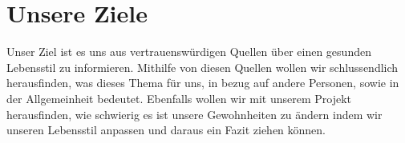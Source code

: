 \chapter{Unsere Ziele}

Unser Ziel ist es uns aus vertrauenswürdigen Quellen über einen gesunden Lebensstil zu informieren. Mithilfe von diesen Quellen wollen wir schlussendlich herausfinden, was dieses Thema für uns, in bezug auf andere Personen, sowie in der Allgemeinheit bedeutet.
\newline
Ebenfalls wollen wir mit unserem Projekt herausfinden, wie schwierig es ist unsere Gewohnheiten zu ändern indem wir unseren Lebensstil anpassen und daraus ein Fazit ziehen können.